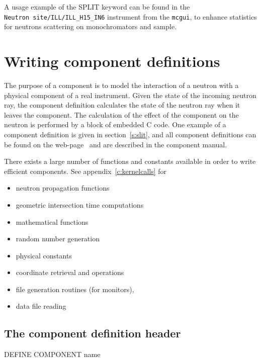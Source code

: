 A usage example of the SPLIT keyword can be found in the \\
\verb+Neutron site/ILL/ILL_H15_IN6+ instrument from the \verb+mcgui+, to enhance
statistics for neutrons scattering on monochromators and sample.

\section{Writing component definitions}
\label{s:compdefs}

The purpose of a \MCS component is to model the interaction of a
neutron with a physical component of a real instrument. Given the
state of the incoming neutron ray, the
component definition calculates the state of the neutron ray when it leaves
the component.  The calculation of the effect of the component on the
neutron is performed by a block of embedded C code.
One example of a component definition is given in section~\ref{s:slit}, and all
component definitions can be found on the \MCS
web-page~\cite{mcstas_webpage} and are described in the \MCS component manual.

There exists a large number of functions and constants available in
order to write efficient components. See appendix~\ref{c:kernelcalls}
for
\begin{itemize}
\item neutron propagation functions
\item geometric intersection time computations
\item mathematical functions
\item random number generation
\item physical constants
\item coordinate retrieval and operations
\item file generation routines (for monitors),
\item data file reading
\end{itemize}



\subsection{The component definition header}
\label{s:comp-header}

\begin{mcstas}
DEFINE COMPONENT name
\end{mcstas}

